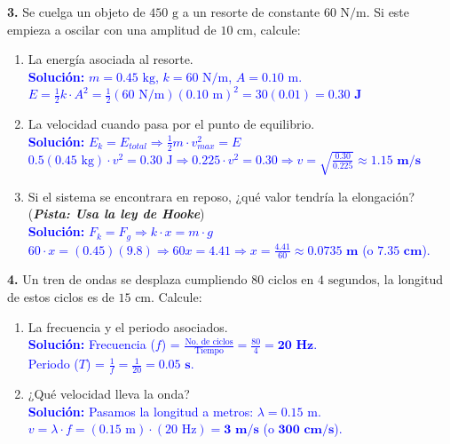 \documentclass[11pt, letterpaper]{article}
\begin{document}
	\noindent \textbf{3.} Se cuelga un objeto de $450\text{ g}$ a un resorte de constante $60\text{ N/m}$. Si este empieza a oscilar con una amplitud de $10\text{ cm}$, calcule:
	\begin{enumerate}[label=\alph*), itemsep=0.3cm, leftmargin=0.8cm]
		\item La energía asociada al resorte.\\
		\textcolor{blue}{\textbf{Solución:} $m = 0.45 \text{ kg}$, $k = 60 \text{ N/m}$, $A = 0.10 \text{ m}$.\\
			$E = \frac{1}{2} k \cdot A^2 = \frac{1}{2}(60 \text{ N/m})(0.10 \text{ m})^2 = 30(0.01) = \mathbf{0.30 \text{ J}}$}
		
		\item La velocidad cuando pasa por el punto de equilibrio.\\
		\textcolor{blue}{\textbf{Solución:} $E_k = E_{total} \Rightarrow \frac{1}{2} m \cdot v_{max}^2 = E$\\
			$0.5(0.45 \text{ kg}) \cdot v^2 = 0.30 \text{ J} \Rightarrow 0.225 \cdot v^2 = 0.30 \Rightarrow v = \sqrt{\frac{0.30}{0.225}} \approx \mathbf{1.15 \text{ m/s}}$}
		
		\item Si el sistema se encontrara en reposo, ¿qué valor tendría la elongación? (\textbf{\textit{Pista: Usa la ley de Hooke}})\\
		\textcolor{blue}{\textbf{Solución:} $F_k = F_g \Rightarrow k \cdot x = m \cdot g$\\
			$60 \cdot x = (0.45)(9.8) \Rightarrow 60x = 4.41 \Rightarrow x = \frac{4.41}{60} \approx \mathbf{0.0735 \text{ m}}$ (o $\mathbf{7.35 \text{ cm}}$).}
	\end{enumerate}
	
	\vspace{0.8cm}
	
	\noindent \textbf{4.} Un tren de ondas se desplaza cumpliendo $80\text{ ciclos}$ en $4\text{ segundos}$, la longitud de estos ciclos es de $15\text{ cm}$. Calcule:
	\begin{enumerate}[label=\alph*), itemsep=0.3cm, leftmargin=0.8cm]
		\item La frecuencia y el periodo asociados.\\
		\textcolor{blue}{\textbf{Solución:} Frecuencia ($f$) = $\frac{\text{No. de ciclos}}{\text{Tiempo}} = \frac{80}{4} = \mathbf{20 \text{ Hz}}$.\\
			Periodo ($T$) = $\frac{1}{f} = \frac{1}{20} = \mathbf{0.05 \text{ s}}$.}
		
		\item ¿Qué velocidad lleva la onda?\\
		\textcolor{blue}{\textbf{Solución:} Pasamos la longitud a metros: $\lambda = 0.15 \text{ m}$.\\
			$v = \lambda \cdot f = (0.15 \text{ m}) \cdot (20 \text{ Hz}) = \mathbf{3 \text{ m/s}}$ (o $\mathbf{300 \text{ cm/s}}$).}
	\end{enumerate}
	
\end{document}
